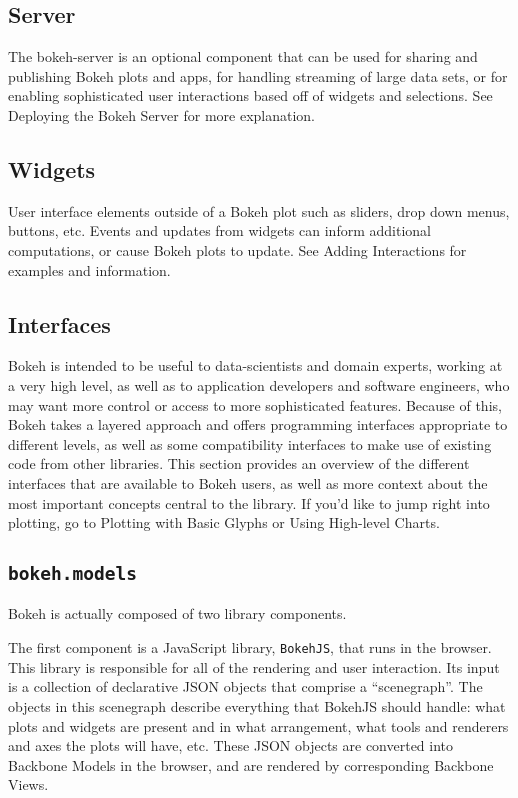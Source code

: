 \subsection*{Server}
The bokeh-server is an optional component that can be used for sharing and publishing Bokeh plots and apps, for handling streaming of large data sets, or for enabling sophisticated user interactions based off of widgets and selections. See Deploying the Bokeh Server for more explanation.
\subsection*{Widgets}
User interface elements outside of a Bokeh plot such as sliders, drop down menus, buttons, etc. Events and updates from widgets can inform additional computations, or cause Bokeh plots to update. See Adding Interactions for examples and information.
\subsection*{Interfaces}
Bokeh is intended to be useful to data-scientists and domain experts, working at a very high level, as well as to application developers and software engineers, who may want more control or access to more sophisticated features. Because of this, Bokeh takes a layered approach and offers programming interfaces appropriate to different levels, as well as some compatibility interfaces to make use of existing code from other libraries. This section provides an overview of the different interfaces that are available to Bokeh users, as well as more context about the most important concepts central to the library. If you’d like to jump right into plotting, go to Plotting with Basic Glyphs or Using High-level Charts.
\newpage

\subsection{\texttt{bokeh.models}}
Bokeh is actually composed of two library components.

The first component is a JavaScript library, \texttt{BokehJS}, that runs in the browser. This library is responsible for all of the rendering and user interaction. Its input is a collection of declarative JSON objects that comprise a “scenegraph”. The objects in this scenegraph describe everything that BokehJS should handle: what plots and widgets are present and in what arrangement, what tools and renderers and axes the plots will have, etc. These JSON objects are converted into Backbone Models in the browser, and are rendered by corresponding Backbone Views.

